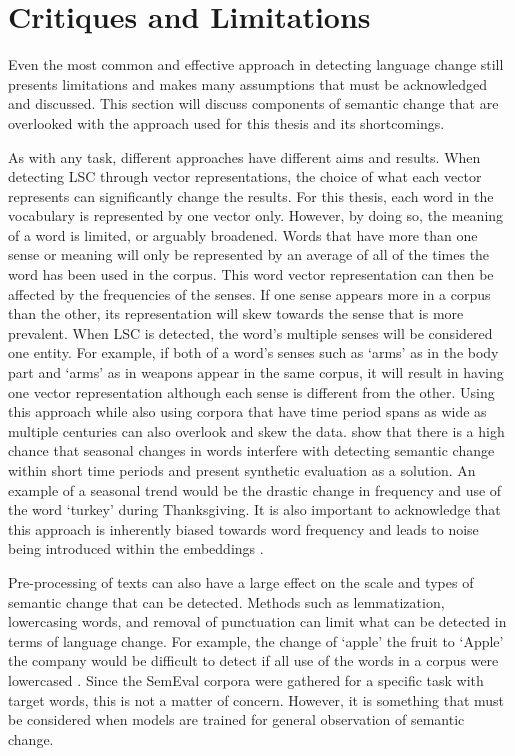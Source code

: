 \section{Critiques and Limitations}
\label{sec:critiques}

Even the most common and effective approach in detecting language change still presents limitations and makes many assumptions that must be acknowledged and discussed. This section will discuss components of semantic change that are overlooked with the approach used for this thesis and its shortcomings. 

As with any task, different approaches have different aims and results. When detecting LSC through vector representations, the choice of what each vector represents can significantly change the results. For this thesis, each word in the vocabulary is represented by one vector only. However, by doing so, the meaning of a word is limited, or arguably broadened. Words that have more than one sense or meaning will only be represented by an average of all of the times the word has been used in the corpus. This word vector representation can then be affected by the frequencies of the senses. If one sense appears more in a corpus than the other, its representation will skew towards the sense that is more prevalent.  When LSC is detected, the word’s multiple senses will be considered one entity. For example, if both of a word’s senses such as ‘arms’ as in the body part and ‘arms’ as in weapons appear in the same corpus, it will result in having one vector representation although each sense is different from the other. Using this approach while also using corpora that have time period spans as wide as multiple centuries can also overlook and skew the data. \citet{shoemark-etal-2019-room} show that there is a high chance that seasonal changes in words interfere with detecting semantic change within short time periods and present synthetic evaluation as a solution. An example of a seasonal trend would be the drastic change in frequency and use of the word `turkey' during Thanksgiving. It is also important to acknowledge that this approach is inherently biased towards word frequency and leads to noise being introduced within the embeddings \citep{dubossarsky-etal-2017-outta, kaiser-etal-2020-ims, schlechtweg-etal-2020-semeval}.

Pre-processing of texts can also have a large effect on the scale and types of semantic change that can be detected. Methods such as lemmatization, lowercasing words, and removal of punctuation can limit what can be detected in terms of language change. For example, the change of `apple' the fruit to `Apple' the company would be difficult to detect if all use of the words in a corpus were lowercased \citep{tahmasebi-survey2018}. Since the SemEval corpora were gathered for a specific task with target words, this is not a matter of concern. However, it is something that must be considered when models are trained for general observation of semantic change.

